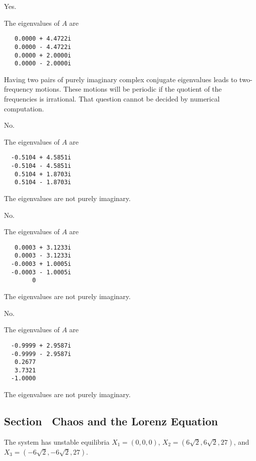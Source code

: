 \begin{figure}[htb]
                       \centerline{%
			\hspace{1.0in}
                       }
\end{figure}

  \ans Yes.

\soln The eigenvalues of $A$ are 
\begin{verbatim}
   0.0000 + 4.4722i
   0.0000 - 4.4722i
   0.0000 + 2.0000i
   0.0000 - 2.0000i
\end{verbatim}
Having two pairs of purely imaginary complex conjugate eigenvalues leads to
two-frequency motions.  These motions will be periodic if the quotient of the 
frequencies is irrational.  That question cannot be decided by numerical
computation.


 \ans No.

\soln The eigenvalues of $A$ are 
\begin{verbatim}
  -0.5104 + 4.5851i
  -0.5104 - 4.5851i
   0.5104 + 1.8703i
   0.5104 - 1.8703i
\end{verbatim}
The eigenvalues are not purely imaginary.

 \ans No.

\soln The eigenvalues of $A$ are 
\begin{verbatim}
   0.0003 + 3.1233i
   0.0003 - 3.1233i
  -0.0003 + 1.0005i
  -0.0003 - 1.0005i
        0          
\end{verbatim}
The eigenvalues are not purely imaginary.

 \ans No.

\soln The eigenvalues of $A$ are 
\begin{verbatim}
  -0.9999 + 2.9587i
  -0.9999 - 2.9587i
   0.2677          
   3.7321          
  -1.0000          
\end{verbatim}
The eigenvalues are not purely imaginary.


\subsection*{Section~\protect{\ref{S:chaos}} Chaos and the Lorenz Equation}


 \ans The system has unstable equilibria $X_1 = (0,0,0)$, 
$X_2 = (6\sqrt{2},6\sqrt{2},27)$, and $X_3 = (-6\sqrt{2},-6\sqrt{2},27)$.

